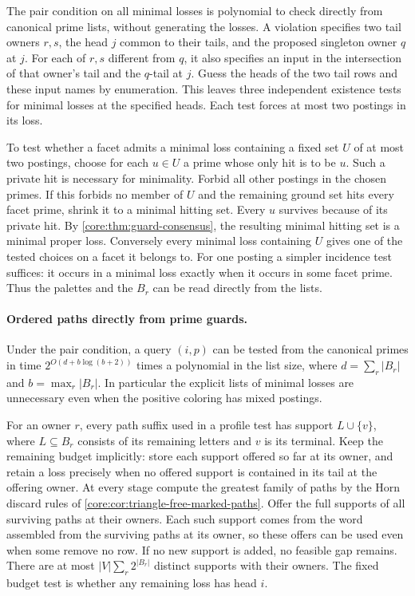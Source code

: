 The pair condition on all minimal losses is polynomial to check
directly from canonical prime lists, without generating the losses.
A violation specifies two tail owners $r,s$, the head $j$ common
to their tails, and the proposed singleton owner $q$ at $j$.
For each of $r,s$ different from $q$, it also specifies an input
in the intersection of that owner's tail and the $q$-tail at $j$.
Guess the heads of the two tail rows and these input names by
enumeration. This leaves three independent existence tests for
minimal losses at the specified heads. Each test forces at most
two postings in its loss.

To test whether a facet admits a minimal loss containing a fixed
set $U$ of at most two postings, choose for each $u\in U$ a prime
whose only hit is to be $u$. Such a private hit is necessary for
minimality. Forbid all other postings in the chosen primes.
If this forbids no member of $U$ and the remaining ground set
hits every facet prime, shrink it to a minimal hitting set.
Every $u$ survives because of its private hit. By
\cref{core:thm:guard-consensus}, the resulting minimal hitting
set is a minimal proper loss. Conversely every minimal loss
containing $U$ gives one of the tested choices on a facet it
belongs to. For one posting a simpler incidence test suffices:
it occurs in a minimal loss exactly when it occurs in some
facet prime. Thus the palettes and the $B_r$ can be read directly
from the lists.

\paragraph{Ordered paths directly from prime guards.}
Under the pair condition, a query $(i,p)$ can be tested from the
canonical primes in time $2^{O(d+b\log(b+2))}$ times a polynomial
in the list size, where $d=\sum_r|B_r|$ and $b=\max_r|B_r|$. In
particular the explicit lists of minimal losses are unnecessary
even when the positive coloring has mixed postings.

For an owner $r$, every path suffix used in a profile test has
support $L\cup\{v\}$, where $L\subseteq B_r$ consists of its
remaining letters and $v$ is its terminal. Keep the remaining
budget implicitly: store each support offered so far at its
owner, and retain a loss precisely when no offered support is
contained in its tail at the offering owner. At every stage
compute the greatest family of paths by the Horn discard rules
of \cref{core:cor:triangle-free-marked-paths}. Offer the full
supports of all surviving paths at their owners. Each such
support comes from the word assembled from the surviving paths
at its owner, so these offers can be used even when some remove
no row. If no new support is added, no feasible gap remains.
There are at most $|V|\sum_r2^{|B_r|}$ distinct supports with
their owners. The fixed budget test is whether any remaining
loss has head $i$.

